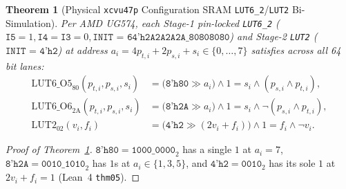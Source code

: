 \documentclass[11pt,letterpaper]{article}
\theoremstyle{spectralthm}
\newtheorem{theorem}{Theorem}[section]
\begin{document}
\begin{theorem}[Physical \texttt{xcvu47p} Configuration SRAM \texttt{LUT6\_2}/\texttt{LUT2} Bi-Simulation]
\label{thm:lut_sram}
Per AMD UG574, each Stage-1 pin-locked \mbox{\texttt{LUT6\_2}} ($\texttt{I5} = 1, \texttt{I4} = \texttt{I3} = 0, \texttt{INIT = 64'h2A2A2A2A\_80808080}$) and Stage-2 \texttt{LUT2} ($\texttt{INIT = 4'h2}$) at address $a_i = 4p_{t,i} + 2p_{s,i} + s_i \in \{0,\ldots,7\}$ satisfies across all 64 bit lanes:
\begin{equation}
\label{eq:lut6_o5}
\begin{aligned}
\mathrm{LUT6\_O5}_{80}(p_{t,i}, p_{s,i}, s_i) &= \bigl(\texttt{8'h80} \gg a_i\bigr) \wedge 1 = s_i \wedge (p_{s,i} \wedge p_{t,i}),\\
\mathrm{LUT6\_O6}_{2\mathrm{A}}(p_{t,i}, p_{s,i}, s_i) &= \bigl(\texttt{8'h2A} \gg a_i\bigr) \wedge 1 = s_i \wedge \neg(p_{s,i} \wedge p_{t,i}),\\
\mathrm{LUT2}_{02}(v_i, f_i) &= \bigl(\texttt{4'h2} \gg (2v_i + f_i)\bigr) \wedge 1 = f_i \wedge \neg v_i.
\end{aligned}
\end{equation}
\end{theorem}
\begin{proof}[Proof of Theorem~\ref{thm:lut_sram}]
$\texttt{8'h80} = \texttt{1000\_0000}_2$ has a single $1$ at $a_i = 7$, $\texttt{8'h2A} = \texttt{0010\_1010}_2$ has $1$s at $a_i \in \{1, 3, 5\}$, and $\texttt{4'h2} = \texttt{0010}_2$ has its sole $1$ at $2v_i + f_i = 1$ (Lean~4 \texttt{thm05}).
\end{proof}
\end{document}
